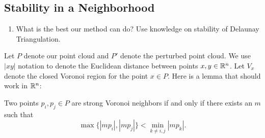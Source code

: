 \documentclass[letterpaper,titlepage]{article}
\begin{document}
\subsection{Stability in a Neighborhood}\label{stability}
\begin{enumerate}
    \item What is the best our method can do? Use knowledge on stability of Delaunay Triangulation.
\end{enumerate}
    Let $P$ denote our point cloud and $P'$ denote the perturbed point cloud. We use $|xy|$ notation to denote the Euclidean distance between points $x,y \in \mathbb{R}^n$. Let $V_x$ denote the closed Voronoi region for the point $x \in P$. Here is a lemma that should work in $\mathbb{R}^n$:
    \begin{lem}\label{paperlemma}
    Two points $p_i,p_j \in P$ are strong Voronoi neighbors if and only if there exists an $m$ such that
    $$\max\{|mp_i|,|mp_j|\} < \min_{k \neq i,j}|mp_k|.$$
    \end{lem}
    
\end{document}
